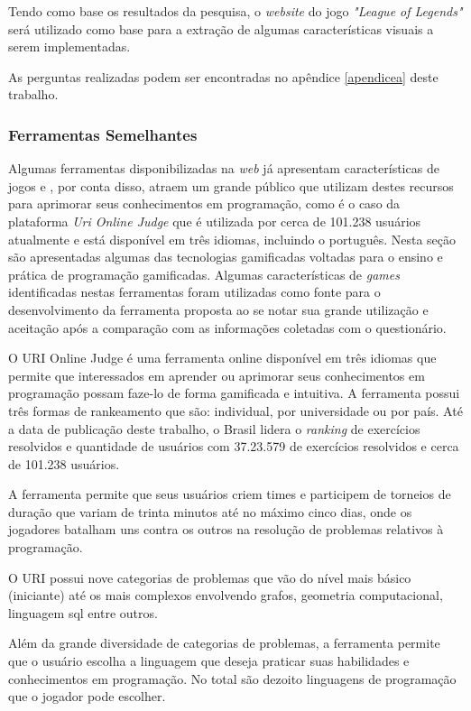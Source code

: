Tendo como base os resultados da pesquisa, o \textit{website} do jogo \textit{"League of Legends"} será utilizado como base para a extração de algumas
características visuais a serem implementadas.

As perguntas realizadas podem ser encontradas no apêndice \ref{apendicea} deste trabalho.

\subsubsection{Ferramentas Semelhantes}
Algumas ferramentas disponibilizadas na \textit{web} já apresentam características de jogos e , por conta disso,
atraem um grande público que utilizam destes recursos para aprimorar seus conhecimentos em programação, como é
o caso da plataforma \textit{Uri Online Judge} que é utilizada por cerca de 101.238 usuários atualmente e está disponível em três
idiomas, incluindo o português.
Nesta seção são apresentadas algumas das tecnologias gamificadas voltadas para o ensino e prática de programação
gamificadas. Algumas características de \textit{games} identificadas nestas ferramentas foram utilizadas como fonte
para o desenvolvimento da ferramenta proposta ao se notar sua grande utilização e aceitação após a comparação com as 
informações coletadas com o questionário.

O URI Online Judge é uma ferramenta online disponível em três idiomas que permite que interessados em aprender ou
aprimorar seus conhecimentos em programação possam faze-lo de forma gamificada e intuitiva. A ferramenta possui três
formas de rankeamento que são: individual, por universidade ou por país. Até a data de publicação deste trabalho, o Brasil
lidera o \textit{ranking} de exercícios resolvidos e quantidade de usuários com 37.23.579 de exercícios resolvidos e cerca
de 101.238 usuários. \cite{URI} 

A ferramenta permite que seus usuários criem times e participem de torneios de duração que variam de trinta minutos até no 
máximo cinco dias, onde os jogadores batalham uns contra os outros na resolução de problemas relativos à programação.

O URI possui nove categorias de problemas que vão do nível mais básico (iniciante) até os mais complexos envolvendo grafos,
geometria computacional, linguagem sql entre outros.

Além da grande diversidade de categorias de problemas, a ferramenta permite que o usuário escolha a linguagem que deseja
praticar suas habilidades e conhecimentos em programação. No total são dezoito linguagens de programação que o jogador pode 
escolher.

